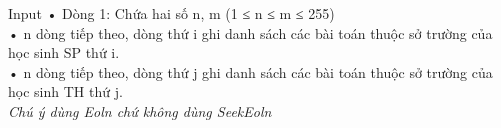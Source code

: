 Input
• Dòng 1: Chứa hai số n, m (1 ≤ n ≤ m ≤ 255)   
\\   • n dòng tiếp theo, dòng thứ i ghi danh sách các bài toán thuộc sở trường của học sinh SP thứ i.   
\\   • n dòng tiếp theo, dòng thứ j ghi danh sách các bài toán thuộc sở trường của học sinh TH thứ j.   
\\\textit{    Chú ý dùng         Eoln        chứ không dùng         SeekEoln       }
\\